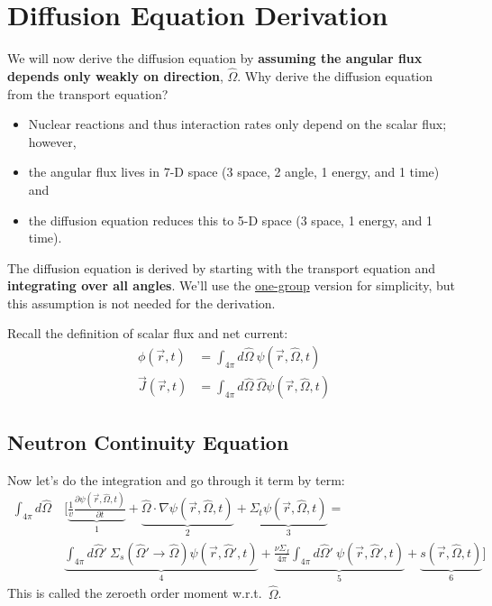 \documentclass[12pt]{article}
\newlength{\up}
\newcommand{\vOmega}{\ensuremath{\hat{\Omega}}}
\begin{document}
\section*{Diffusion Equation Derivation}

We will now derive the diffusion equation by \textbf{assuming the angular flux depends only weakly on direction}, $\vOmega$. 
%
Why derive the diffusion equation from the transport equation?
\begin{itemize}
\item Nuclear reactions and thus interaction rates only depend on the scalar flux; however,
\item the angular flux lives in 7-D space (3 space, 2 angle, 1 energy, and 1 time) and
\item the diffusion equation reduces this to 5-D space (3 space, 1 energy, and 1 time).
\end{itemize}

The diffusion equation is derived by starting with the transport equation and \textbf{integrating over all angles}. We'll use the \underline{one-group} version for simplicity, but this assumption is not needed for the derivation. 

Recall the definition of scalar flux and net current:
\begin{align*}
\phi(\vec{r}, t) &= \int_{4\pi} d\vOmega \:\psi(\vec{r}, \vOmega, t) \\
\vec{J}(\vec{r}, t) &= \int_{4\pi} d\vOmega \:\vOmega \psi(\vec{r}, \vOmega, t)
\end{align*}

\subsection*{Neutron Continuity Equation}
Now let's do the integration and go through it term by term:
%
\begin{align*}
\int_{4\pi} d\vOmega\: &\biggl[\underbrace{\frac{1}{v}\frac{\partial \psi(\vec{r}, \vOmega, t)}{\partial t}}_{1} + 
\underbrace{\vOmega \cdot \nabla \psi(\vec{r}, \vOmega, t)}_{2} +
\underbrace{\Sigma_t \psi(\vec{r}, \vOmega, t)}_{3} = \nonumber\\
%
&\underbrace{\int_{4\pi} d\vOmega'\: \Sigma_s(\vOmega' \rightarrow \vOmega) \psi(\vec{r}, \vOmega', t)}_{4} 
+ \underbrace{\frac{\nu \Sigma_f}{4\pi} \int_{4\pi} d\vOmega'\: \psi(\vec{r},  \vOmega', t)}_{5}
+ \underbrace{s(\vec{r}, \vOmega, t)}_{6}\biggr]
\end{align*}
%
This is called the zeroeth order moment w.r.t.\ $\vOmega$. 
\end{document}
